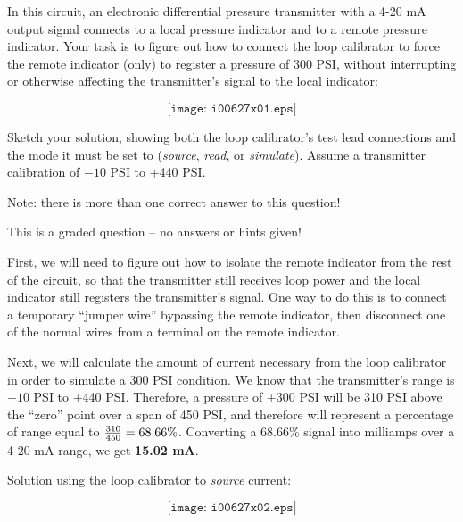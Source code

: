 

In this circuit, an electronic differential pressure transmitter with a 4-20 mA output signal connects to a local pressure indicator and to a remote pressure indicator.  Your task is to figure out how to connect the loop calibrator to force the remote indicator (only) to register a pressure of 300 PSI, without interrupting or otherwise affecting the transmitter's signal to the local indicator:

$$\texttt{[image: i00627x01.eps]}$$

Sketch your solution, showing both the loop calibrator's test lead connections and the mode it must be set to ({\it source}, {\it read}, or {\it simulate}).  Assume a transmitter calibration of $-10$ PSI to +440 PSI.

\vfil

Note: there is more than one correct answer to this question!

\eject






This is a graded question -- no answers or hints given!







First, we will need to figure out how to isolate the remote indicator from the rest of the circuit, so that the transmitter still receives loop power and the local indicator still registers the transmitter's signal.  One way to do this is to connect a temporary ``jumper wire'' bypassing the remote indicator, then disconnect one of the normal wires from a terminal on the remote indicator.

\vskip 10pt

Next, we will calculate the amount of current necessary from the loop calibrator in order to simulate a 300 PSI condition.  We know that the transmitter's range is $-10$ PSI to +440 PSI.  Therefore, a pressure of +300 PSI will be 310 PSI above the ``zero'' point over a span of 450 PSI, and therefore will represent a percentage of range equal to ${310 \over 450} = 68.66\%$.  Converting a 68.66\% signal into milliamps over a 4-20 mA range, we get {\bf 15.02 mA}.

\vskip 10pt

Solution using the loop calibrator to {\it source} current:

$$\texttt{[image: i00627x02.eps]}$$






